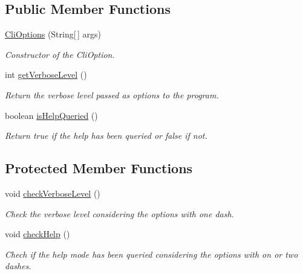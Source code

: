 \subsection*{Public Member Functions}
\begin{DoxyCompactItemize}
\item 
\hyperlink{a00006_ae5dfa0d3322f2d74bc44c6cccaf931e4}{Cli\-Options} (String\mbox{[}$\,$\mbox{]} args)
\begin{DoxyCompactList}\small\item\em Constructor of the Cli\-Option. \end{DoxyCompactList}\item 
int \hyperlink{a00006_a7b9655bcabe2969db66c0c5dab5487b8}{get\-Verbose\-Level} ()
\begin{DoxyCompactList}\small\item\em Return the verbose level passed as options to the program. \end{DoxyCompactList}\item 
boolean \hyperlink{a00006_a34dabb4bbc667b0f56bf210749c260bf}{is\-Help\-Queried} ()
\begin{DoxyCompactList}\small\item\em Return true if the help has been queried or false if not. \end{DoxyCompactList}\end{DoxyCompactItemize}
\subsection*{Protected Member Functions}
\begin{DoxyCompactItemize}
\item 
void \hyperlink{a00006_af9e27c7e2ce04aa2b9cfb42ac35db767}{check\-Verbose\-Level} ()
\begin{DoxyCompactList}\small\item\em Check the verbose level considering the options with one dash. \end{DoxyCompactList}\item 
void \hyperlink{a00006_ab0a2db9986b5ae6ac696e9a5e596eff1}{check\-Help} ()
\begin{DoxyCompactList}\small\item\em Chech if the help mode has been queried considering the options with on or two dashes. \end{DoxyCompactList}\end{DoxyCompactItemize}
